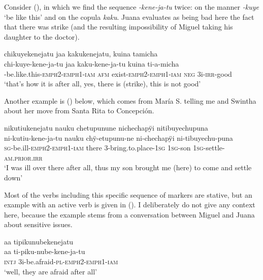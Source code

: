 Consider (), in which we find the sequence \textit{-kene-ja-tu} twice: on the manner  \textit{-kuye} ‘be like this’ and on the copula \textit{kaku}. Juana evaluates as being bad here the fact that there was strike (and the resulting impossibility of Miguel taking his daughter to the doctor). 

\ea\label{ex:nmlz-strange}
\begingl
\glpreamble chikuyekenejatu jaa kakukenejatu, kuina tamicha\\
\gla chi-kuye-kene-ja-tu jaa kaku-kene-ja-tu kuina ti-a-micha\\
-be.like.this-\textsc{emph}2-\textsc{emph}1-\textsc{iam} \textsc{afm} exist-\textsc{emph}2-\textsc{emph}1-\textsc{iam} \textsc{neg} 3i-\textsc{irr}-good\\
\glft ‘that’s how it is after all, yes, there is (strike), this is not good’
\endgl
\trailingcitation{[jxx-e120516l-1.084]}
\xe

Another example is () below, which comes from María S. telling me and Swintha about her move from Santa Rita to Concepción.

\ea\label{ex:kenejatu}
\begingl
\glpreamble nikutiukenejatu nauku chetupunune nichechapÿi nitibuyechupuna\\
\gla ni-kutiu-kene-ja-tu nauku chÿ-etupunu-ne ni-chechapÿi ni-tibuyechu-puna\\
\textsc{sg}-be.ill-\textsc{emph}2-\textsc{emph}1-\textsc{iam} there 3-bring.to.place-1\textsc{sg} 1\textsc{sg}-son 1\textsc{sg}-settle-\textsc{am.prior.irr}\\
\glft ‘I was ill over there after all, thus my son brought me (here) to come and settle down’
\endgl
\trailingcitation{[cux-120410ls.115]}
\xe

Most of the verbs including this specific sequence of markers are stative, but an example with an active verb is given in (). I deliberately do not give any context here, because the example stems from a conversation between Miguel and Juana about sensitive issues.

\ea\label{ex:active-kene}
\begingl
\glpreamble aa tipikunubekenejatu\\
\gla aa ti-piku-nube-kene-ja-tu\\
\glb \textsc{intj} 3i-be.afraid-\textsc{pl}-\textsc{emph}2-\textsc{emph}1-\textsc{iam}\\
\glft ‘well, they are afraid after all’
\endgl
\trailingcitation{[jmx-c120429ls-x5.138]}
\xe


